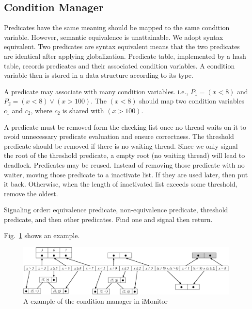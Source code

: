 \documentclass[preprint]{sigplanconf}
\begin{document}
\subsection{Condition Manager}
Predicates have the same meaning should be mapped to the same condition
variable. However, semantic equivalence is unattainable. We adopt syntax 
equivalent. Two predicates are syntax equivalent means that the two predicates
are identical after applying globalization. Predicate table, implemented by a
hash table, records predicates and their associated condition variables. A 
condition variable then is stored in a data structure according to its type.  

A predicate may associate with many condition variables. i.e., $P_1 = (x < 8)$
and $P_2 = (x < 8) \vee (x > 100)$. The $(x < 8)$ should map two condition
variables $c_1$ and $c_2$, where $c_2$ is shared with $(x > 100)$. 

A predicate must be removed form the checking list once no thread waits on 
it to avoid unnecessary predicate evaluation and ensure correctness. 
The threshold predicate should be removed if there is no waiting thread. Since 
we only signal the root of the threshold predicate, a empty root 
(no waiting thread) will lead to deadlock. Predicates may be reused. Instead of
removing those predicate with no waiter, moving those predicate to a inactivate
list. If they are used later, then put it back. Otherwise, when the length of 
inactivated list exceeds some threshold, remove the oldest.

Signaling order: equivalence predicate, non-equivalence predicate, threshold
predicate, and then other predicates. Find one and signal then return. 


Fig.~\ref{fig:mgr} shows an example. 
\begin{figure}[ht!]
  \centering
  \includegraphics[width=160mm]{fig/manager.eps}
  \caption{A example of the condition manager in iMonitor}
  \label{fig:mgr}
\end{figure}

\clearpage
\end{document}
